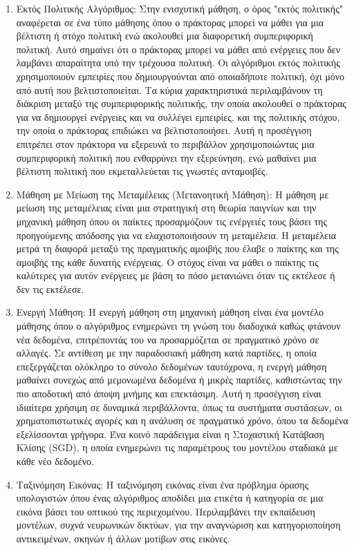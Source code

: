 \begin{enumerate}
    \item Εκτός Πολιτικής Αλγόριθμος: Στην ενισχυτική μάθηση, ο όρος "εκτός πολιτικής" αναφέρεται σε ένα τύπο μάθησης όπου ο πράκτορας μπορεί να μάθει για μια βέλτιστη ή στόχο πολιτική ενώ ακολουθεί μια διαφορετική συμπεριφορική πολιτική. Αυτό σημαίνει ότι ο πράκτορας μπορεί να μάθει από ενέργειες που δεν λαμβάνει απαραίτητα υπό την τρέχουσα πολιτική. Οι αλγόριθμοι εκτός πολιτικής χρησιμοποιούν εμπειρίες που δημιουργούνται από οποιαδήποτε πολιτική, όχι μόνο από αυτή που βελτιστοποιείται. Τα κύρια χαρακτηριστικά περιλαμβάνουν τη διάκριση μεταξύ της συμπεριφορικής πολιτικής, την οποία ακολουθεί ο πράκτορας για να δημιουργεί ενέργειες και να συλλέγει εμπειρίες, και της πολιτικής στόχου, την οποία ο πράκτορας επιδιώκει να βελτιστοποιήσει. Αυτή η προσέγγιση επιτρέπει στον πράκτορα να εξερευνά το περιβάλλον χρησιμοποιώντας μια συμπεριφορική πολιτική που ενθαρρύνει την εξερεύνηση, ενώ μαθαίνει μια βέλτιστη πολιτική που εκμεταλλεύεται τις γνωστές ανταμοιβές.

    \item Μάθηση με Μείωση της Μεταμέλειας (Μετανοητική Μάθηση): Η μάθηση με μείωση της μεταμέλειας είναι μια στρατηγική στη θεωρία παιγνίων και την μηχανική μάθηση όπου οι παίκτες προσαρμόζουν τις ενέργειές τους βάσει της προηγούμενης απόδοσης για να ελαχιστοποιήσουν τη μεταμέλεια. Η μεταμέλεια μετρά τη διαφορά μεταξύ της πραγματικής αμοιβής που έλαβε ο παίκτης και της αμοιβής της κάθε δυνατής ενέργειας. Ο στόχος είναι να μάθει ο παίκτης τις καλύτερες για αυτόν ενέργειες με βάση το πόσο μετανιώνει όταν τις εκτέλεσε ή δεν τις εκτέλεσε.

    \item Ενεργή Μάθηση: Η ενεργή μάθηση στη μηχανική μάθηση είναι ένα μοντέλο μάθησης όπου ο αλγόριθμος ενημερώνει τη γνώση του διαδοχικά καθώς φτάνουν νέα δεδομένα, επιτρέποντάς του να προσαρμόζεται σε πραγματικό χρόνο σε αλλαγές. Σε αντίθεση με την παραδοσιακή μάθηση κατά παρτίδες, η οποία επεξεργάζεται ολόκληρο το σύνολο δεδομένων ταυτόχρονα, η ενεργή μάθηση μαθαίνει συνεχώς από μεμονωμένα δεδομένα ή μικρές παρτίδες, καθιστώντας την πιο αποδοτική από άποψη μνήμης και επεκτάσιμη. Αυτή η προσέγγιση είναι ιδιαίτερα χρήσιμη σε δυναμικά περιβάλλοντα, όπως τα συστήματα συστάσεων, οι χρηματοπιστωτικές αγορές και η ανάλυση σε πραγματικό χρόνο, όπου τα δεδομένα εξελίσσονται γρήγορα. Ένα κοινό παράδειγμα είναι η Στοχαστική Κατάβαση Κλίσης (SGD), η οποία ενημερώνει τις παραμέτρους του μοντέλου σταδιακά με κάθε νέο δεδομένο.

    \item Ταξινόμηση Εικόνας: Η ταξινόμηση εικόνας είναι ένα πρόβλημα όρασης υπολογιστών όπου ένας αλγόριθμος αποδίδει μια ετικέτα ή κατηγορία σε μια εικόνα βάσει του οπτικού της περιεχομένου. Περιλαμβάνει την εκπαίδευση μοντέλων, συχνά νευρωνικών δικτύων, για την αναγνώριση και κατηγοριοποίηση αντικειμένων, σκηνών ή άλλων μοτίβων στις εικόνες.


\end{enumerate}
